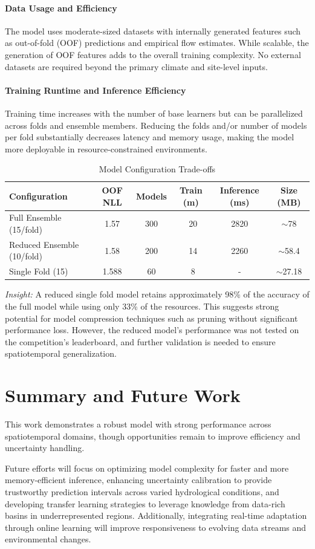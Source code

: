 \documentclass[a4paper,12pt]{article}
\begin{document}
\paragraph{Data Usage and Efficiency}
The model uses moderate-sized datasets with internally generated features such as out-of-fold (OOF) predictions and empirical flow estimates. While scalable, the generation of OOF features adds to the overall training complexity. No external datasets are required beyond the primary climate and site-level inputs.

\paragraph{Training Runtime and Inference Efficiency}
Training time increases with the number of base learners but can be parallelized across folds and ensemble members. Reducing the folds and/or number of models per fold substantially decreases latency and memory usage, making the model more deployable in resource-constrained environments.

\begin{table}[H]
\centering
\caption{Model Configuration Trade-offs}
\begin{tabular}{lccccc}
\hline
\textbf{Configuration} & \textbf{OOF NLL} & \textbf{Models} & \textbf{Train (m)} & \textbf{Inference (ms)} & \textbf{Size (MB)} \\
\hline
Full Ensemble (15/fold) & 1.57 & 300 & ~20 & 2820 & $\sim$78 \\
Reduced Ensemble (10/fold) & 1.58 & 200 & ~14 & 2260 & $\sim$58.4 \\
Single Fold (15) & 1.588 & 60 & ~8 & - & $\sim$27.18 \\

\hline
\end{tabular}
\label{tab:frugality}
\end{table}

\noindent \textit{Insight:} A reduced single fold model retains approximately 98\% of the accuracy of the full model while using only 33\% of the resources. This suggests strong potential for model compression techniques such as pruning without significant performance loss.
However, the reduced model's performance was not tested on the competition's leaderboard, and further validation is needed to ensure spatiotemporal generalization. 
\section{Summary and Future Work}

This work demonstrates a robust model with strong performance across spatiotemporal domains, though opportunities remain to improve efficiency and uncertainty handling.

Future efforts will focus on optimizing model complexity for faster and more memory-efficient inference, enhancing uncertainty calibration to provide trustworthy prediction intervals across varied hydrological conditions, and developing transfer learning strategies to leverage knowledge from data-rich basins in underrepresented regions. Additionally, integrating real-time adaptation through online learning will improve responsiveness to evolving data streams and environmental changes.
\end{document}

